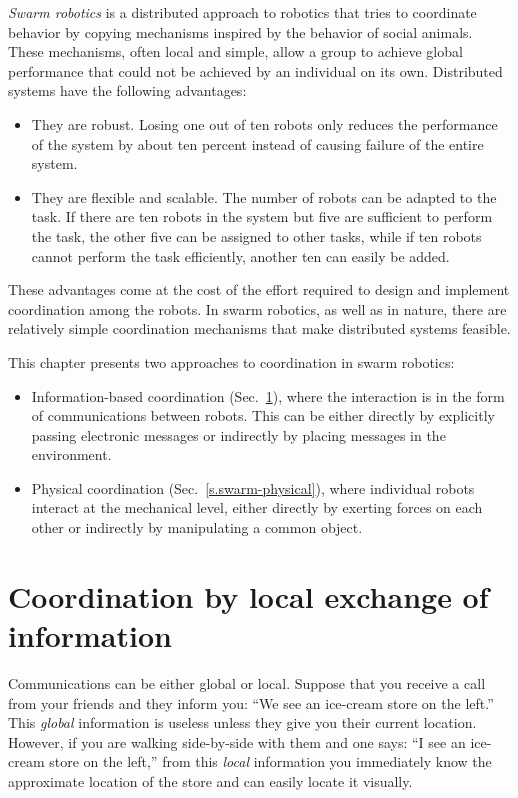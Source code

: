 \emph{Swarm robotics} is a distributed approach to robotics that tries to coordinate behavior by copying mechanisms inspired by the behavior of social animals. These mechanisms, often local and simple, allow a group to achieve global performance that could not be achieved by an individual on its own. Distributed systems have the following advantages:
\begin{itemize}
\item They are robust. Losing one out of ten robots only reduces the performance of the system by about ten percent instead of causing failure of the entire system.
\item They are flexible and scalable. The number of robots can be adapted to the task. If there are ten robots in the system but five are sufficient to perform the task, the other five can be assigned to other tasks, while if ten robots cannot perform the task efficiently, another ten can easily be added.
\end{itemize}
These advantages come at the cost of the effort required to design and implement coordination among the robots. In swarm robotics, as well as in nature, there are relatively simple coordination mechanisms that make distributed systems feasible.

This chapter presents two approaches to coordination in swarm robotics: \begin{itemize}
\item Information-based coordination (Sec.~\ref{s.swarm-info}), where the interaction is in the form of communications between robots. This can be either directly by explicitly passing electronic messages or indirectly by placing messages in the environment.
\item Physical coordination (Sec.~\ref{s.swarm-physical}), where individual robots interact at the mechanical level, either directly by exerting forces on each other or indirectly by manipulating a common object.
\end{itemize}

\section{Coordination by local exchange of information}\label{s.swarm-info}

Communications can be either global or local. Suppose that you receive a call from your friends and they inform you: ``We see an ice-cream store on the left.'' This \emph{global} information is useless unless they give you their current location. However, if you are walking side-by-side with them and one says: ``I see an ice-cream store on the left,'' from this \emph{local} information you immediately know the approximate location of the store and can easily locate it visually.

